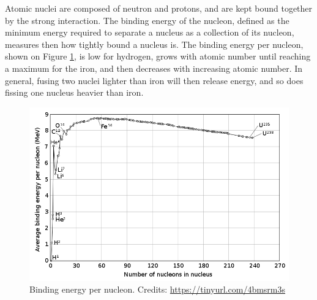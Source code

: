 \documentclass[my_thesis.tex]{subfiles}
\begin{document}
Atomic nuclei are composed of neutron and protons, and are kept bound together by the strong interaction. The binding energy of the nucleon, defined as the minimum energy required to separate a nucleus as a collection of its nucleon, measures then how tightly bound a nucleus is. The binding energy per nucleon, shown on Figure \ref{fig. binding energy}, is low for hydrogen, grows with atomic number until reaching a maximum for the iron, and then decreases with increasing atomic number. In general, fusing two nuclei lighter than iron will then release energy, and so does fissing one nucleus heavier than iron.

\begin{figure}
    \centering
    \includegraphics[width=.75\linewidth]{images/Introduction/BindingEnergy.png}
    \caption{Binding energy per nucleon. Credits: \url{https://tinyurl.com/4bmsrm3s}}
    \label{fig. binding energy}
\end{figure}
\end{document}
